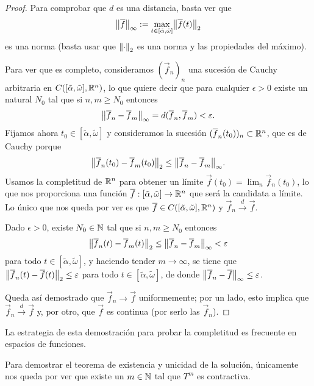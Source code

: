 \documentclass[../ecuaciones_diferenciales.tex]{subfiles}
\begin{document}
\begin{proof}
	Para comprobar que \(d\) es una distancia, basta ver que
	\[\norm{\vec{f}}_\infty 
		:= \max_{t \in [\tilde{\alpha}, \tilde{\omega}]} 
			\norm{\vec{f}(t)}_2\]
	es una norma (basta usar que \(\norm{\cdot}_2\) es una norma y las
	propiedades del máximo).

	Para ver que es completo, consideramos \((\vec{f}_n)_n\) una sucesión de 
	Cauchy arbitraria en \(C([\tilde{\alpha}, \tilde{\omega}], \mathbb{R}^n)\), 
	lo que quiere decir que para cualquier \(\epsilon > 0\) existe un 
	natural \(N_0\) tal que si \(n, m \geq N_0\) entonces
	\[\norm{\vec{f}_n - \vec{f}_m}_\infty 
		= d(\vec{f}_n, \vec{f}_m) < \epsilon.\] 
	Fijamos ahora \(t_0 \in [\tilde{\alpha}, \tilde{\omega}]\) y consideramos la 
	sucesión \((\overline{f}_n(t_0))_n \subset \mathbb{R}^n\), que es de Cauchy porque
	\[\norm{\vec{f}_n(t_0) - \vec{f}_m(t_0)}_2 
		\leq \norm{\vec{f}_n - \vec{f}_m}_\infty.\] 
	Usamos la completitud de \(\mathbb{R}^n\) para obtener un límite 
	\(\vec{f}(t_0) = \lim_n \vec{f}_n(t_0)\), lo
	que nos proporciona una función 
	\(\overline{f}: [\tilde{\alpha}, \tilde{\omega}] \to \mathbb{R}^n\) que será la candidata
	a límite. Lo único que nos queda por ver es que
	\(\overline{f} \in C([\tilde{\alpha}, \tilde{\omega}], \mathbb{R}^n)\) y 
	\(\vec{f}_n \overset{d}{\to} \vec{f}\).

	Dado \(\epsilon > 0\), existe \(N_0 \in \mathbb{N}\) tal que si \(n, m \geq N_0\)
	entonces 
	\[\norm{\vec{f}_n(t) - \vec{f}_m(t)}_2 
		\leq \norm{\vec{f}_n - \vec{f}_m}_\infty < \epsilon\]
	para todo \(t \in [\tilde{\alpha}, \tilde{\omega}]\), y haciendo tender
	\(m \to \infty\), se tiene que
	\(\norm{\vec{f}_n(t) - \vec{f}(t)}_2 \leq \epsilon\) para todo
	\(t \in [\tilde{\alpha}, \tilde{\omega}]\), de donde
	\(\norm{\vec{f}_n - \vec{f}}_\infty \leq \epsilon\).

	Queda así demostrado que \(\vec{f}_n \to \vec{f}\) uniformemente; 
	por un lado, esto implica que \(\vec{f}_n \overset{d}{\to} \vec{f}\) y, 
	por otro, que \(\vec{f}\) es continua (por serlo las \(\vec{f}_n\)).
\end{proof}

\begin{remark}
	La estrategia de esta demostración para probar la completitud es frecuente en
	espacios de funciones.
\end{remark}

Para demostrar el teorema de existencia y unicidad de la solución, únicamente
nos queda por ver que existe un \(m \in \mathbb{N}\) tal que \(T^m\) es contractiva.
\end{document}
